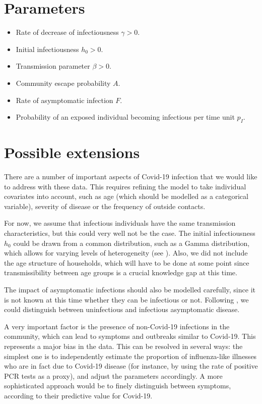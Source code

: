 \documentclass[a4paper]{article}
\begin{document}
\section*{Parameters}

\begin{itemize}
\item Rate of decrease of infectiousness \(\gamma >0\).
\item Initial infectiousness \(h_0 >0\).
\item Transmission parameter \(\beta >0\).
\item Community escape probability \(A\).
\item Rate of asymptomatic infection \(F\).
\item Probability of an exposed individual becoming infectious per time unit 
\(p_I\).

\end{itemize}

\section*{Possible extensions}

There are a number of important aspects of Covid-19 infection that we would like
to address with these data. This requires refining the model to take individual
covariates into account, such as age (which should be modelled as a categorical
variable), severity of disease or the frequency of outside contacts. 

For now, we assume that infectious individuals have the same transmission
characteristics, but this could very well not be the case. The initial
infectiousness \(h_0\) could be drawn from a common distribution,
such as a Gamma distribution, which allows for varying levels of heterogeneity 
(see \cite{Fraser2011}). Also, we did not include the age structure of
households, which will have to be done at some point since transmissibility
between age groups is a crucial knowledge gap at this time.

The impact of asymptomatic infections should also be modelled carefully, since
it is not known at this time whether they can be infectious or not. Following 
\cite{Fraser2011}, we could distinguish between uninfectious and infectious
asymptomatic disease.

A very important factor is the presence of non-Covid-19 infections in the
community, which can lead to symptoms and outbreaks similar to Covid-19. This
represents a major bias in the data. This can be resolved in several ways: the
simplest one is to independently estimate the proportion of influenza-like
illnesses who are in fact due to Covid-19 disease (for instance, by using the
rate of positive PCR tests as a proxy), and adjust the parameters accordingly. A
more sophisticated approach would be to finely distinguish between symptoms,
according to their predictive value for Covid-19.



\end{document}
